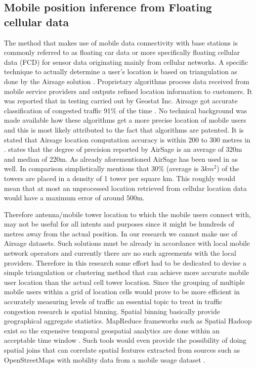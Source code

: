\documentclass[12pt, a4paper]{report}
\theoremstyle{definition}
\theoremstyle{definition}%
\theoremstyle{definition}%
\theoremstyle{definition}%
\theoremstyle{definition}%
\theoremstyle{definition}%
\begin{document}
\subsection{Mobile position inference from Floating cellular data} \label{mobile_inference} 

The method that makes use of mobile data connectivity with base stations is commonly referred to as floating car data or more specifically floating cellular data (FCD) for sensor data originating mainly from cellular networks. A specific technique to actually determine a user's location is based on triangulation as done by the Airsage solution \cite{Hoteit2014}. Proprietary algorithms process data received from mobile service providers and outputs refined location information to customers. It was reported that in testing carried out by Geostat Inc. Airsage got accurate classification of congested traffic 91\% of the time  \cite{Wang2012}. No technical background was made available how these algorithms get a more precise location of mobile users and this is most likely attributed to the fact that algorithms are patented.  It is stated that Airsage location computation accuracy is within 200 to 300 metres in \cite{Colak2015}. \cite{Calabrese2013} states that the degree of precision reported by AirSage is an average of 320m and median of 220m. As already aforementioned AirSage has been used in \cite{Hoteit2014} as well. In comparison \cite{Gonzalez2008} simplistically mentions that 30\% (average is \(3km^{2}\)) of the towers are placed in a density of 1 tower per square km. This roughly would mean that at most an unprocessed location retrieved from cellular location data would have a maximum error of around 500m. 

Therefore antenna/mobile tower location to which the mobile users connect with, may not be useful for all intents and purposes since it might be hundreds of metres away from the actual position. In our research we cannot make use of Airsage datasets. Such solutions must be already in accordance with local mobile network operators and currently there are no such agreements with the local providers. Therefore in this research some effort had to be dedicated to devise a simple triangulation or clustering method that can achieve more accurate mobile user location than the actual cell tower location. Since the grouping of multiple mobile users within a grid of location cells would prove to be more efficient in accurately measuring levels of traffic an essential topic to treat in traffic congestion research is spatial binning. Spatial binning basically provide geographical aggregate statistics.  MapReduce frameworks such as Spatial Hadoop exist so the expensive temporal geospatial analytics are done within an acceptable time window \cite{Wu2014,Eldawy}. Such tools would even provide the possibility of doing spatial joins that can correlate spatial features extracted from sources such as OpenStreetMaps with mobility data from a mobile usage dataset \cite{Alarabi2014}.
\end{document}
